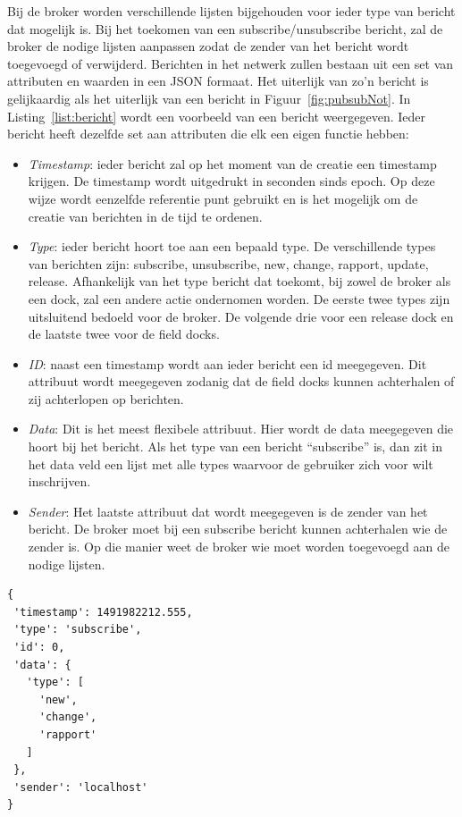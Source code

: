 Bij de broker worden verschillende lijsten bijgehouden voor ieder type van bericht dat mogelijk is.
Bij het toekomen van een subscribe/unsubscribe bericht, zal de broker de nodige lijsten aanpassen zodat de zender van het bericht wordt toegevoegd of verwijderd.
Berichten in het netwerk zullen bestaan uit een set van attributen en waarden in een JSON formaat.
Het uiterlijk van zo'n bericht is gelijkaardig als het uiterlijk van een bericht in Figuur~\vref{fig:pubsubNot}.
In Listing~\vref{list:bericht} wordt een voorbeeld van een bericht weergegeven.
Ieder bericht heeft dezelfde set aan attributen die elk een eigen functie hebben:
\begin{itemize}
\item \emph{Timestamp}: ieder bericht zal op het moment van de creatie een timestamp krijgen.
De timestamp wordt uitgedrukt in seconden sinds epoch.
Op deze wijze wordt eenzelfde referentie punt gebruikt en is het mogelijk om de creatie van berichten in de tijd te ordenen.
\item \emph{Type}: ieder bericht hoort toe aan een bepaald type.
De verschillende types van berichten zijn: subscribe, unsubscribe, new, change, rapport, update, release.
Afhankelijk van het type bericht dat toekomt, bij zowel de broker als een dock, zal een andere actie ondernomen worden.
De eerste twee types zijn uitsluitend bedoeld voor de broker.
De volgende drie voor een release dock en de laatste twee voor de field docks.
\item \emph{ID}: naast een timestamp wordt aan ieder bericht een id meegegeven. 
Dit attribuut wordt meegegeven zodanig dat de field docks kunnen achterhalen of zij achterlopen op berichten.
\item \emph{Data}: Dit is het meest flexibele attribuut. 
Hier wordt de data meegegeven die hoort bij het bericht.
Als het type van een bericht ``subscribe'' is, dan zit in het data veld een lijst met alle types waarvoor de gebruiker zich voor wilt inschrijven.
\item \emph{Sender}: Het laatste attribuut dat wordt meegegeven is de zender van het bericht.
De broker moet bij een subscribe bericht kunnen achterhalen wie de zender is.
Op die manier weet de broker wie moet worden toegevoegd aan de nodige lijsten.
\end{itemize}

\begin{minipage}{\linewidth}
\begin{center}
\begin{lstlisting}[caption={Formaat voor een bericht},label={list:bericht}, xleftmargin=.3\textwidth]
{
 'timestamp': 1491982212.555,
 'type': 'subscribe',
 'id': 0,
 'data': {
   'type': [
     'new',
     'change',
     'rapport'
   ]
 },
 'sender': 'localhost'
}
\end{lstlisting}
\end{center}
\end{minipage}

